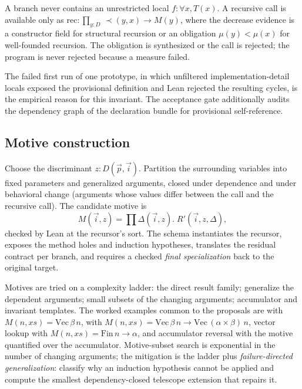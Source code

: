 \begin{invariant}\label{inv:capabilities}
A branch never contains an unrestricted local $f : \forall x, T(x)$. A recursive call is available only as $\mathrm{rec} : \prod_{y:D}\,\prec(y,x) \to M(y)$, where the decrease evidence is a constructor field for structural recursion or an obligation $\mu(y) < \mu(x)$ for well-founded recursion. The obligation is synthesized or the call is rejected; the program is never rejected because a measure failed.
\end{invariant}

The failed first run of one prototype, in which unfiltered implementation-detail locals exposed the provisional definition and Lean rejected the resulting cycles, is the empirical reason for this invariant. The acceptance gate additionally audits the dependency graph of the declaration bundle for provisional self-reference.

\subsection{Motive construction}

\begin{definition}
Choose the discriminant $z : D(\vec p, \vec i)$. Partition the surrounding variables into fixed parameters and generalized arguments, closed under dependence and under behavioral change (arguments whose values differ between the call and the recursive call). The candidate motive is
\[
M(\vec i, z) = \prod \Delta(\vec i, z).\; R'(\vec i, z, \Delta),
\]
checked by Lean at the recursor's sort. The schema instantiates the recursor, exposes the method holes and induction hypotheses, translates the residual contract per branch, and requires a checked \emph{final specialization} back to the original target.
\end{definition}

Motives are tried on a complexity ladder: the direct result family; generalize the dependent arguments; small subsets of the changing arguments; accumulator and invariant templates. The worked examples common to the proposals are  with $M(n, xs) = \mathrm{Vec}\,\beta\,n$,  with $M(n, xs) = \mathrm{Vec}\,\beta\,n \to \mathrm{Vec}\,(\alpha\times\beta)\,n$, vector lookup with $M(n, xs) = \mathrm{Fin}\,n \to \alpha$, and accumulator reversal with the motive quantified over the accumulator. Motive-subset search is exponential in the number of changing arguments; the mitigation is the ladder plus \emph{failure-directed generalization}: classify why an induction hypothesis cannot be applied and compute the smallest dependency-closed telescope extension that repairs it.

